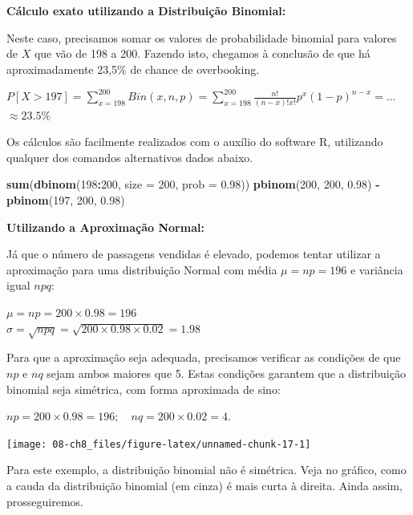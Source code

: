 \documentclass[
]{book}
\newenvironment{Shaded}{\begin{snugshade}}{\end{snugshade}}
\newcommand{\DataTypeTok}[1]{\textcolor[rgb]{0.13,0.29,0.53}{#1}}
\newcommand{\DecValTok}[1]{\textcolor[rgb]{0.00,0.00,0.81}{#1}}
\newcommand{\FloatTok}[1]{\textcolor[rgb]{0.00,0.00,0.81}{#1}}
\newcommand{\KeywordTok}[1]{\textcolor[rgb]{0.13,0.29,0.53}{\textbf{#1}}}
\newcommand{\NormalTok}[1]{#1}
\newcommand{\OperatorTok}[1]{\textcolor[rgb]{0.81,0.36,0.00}{\textbf{#1}}}
\newcommand{\StringTok}[1]{\textcolor[rgb]{0.31,0.60,0.02}{#1}}
\theoremstyle{definition}
\theoremstyle{definition}
\theoremstyle{definition}
\theoremstyle{remark}
\begin{document}
\textbf{Cálculo exato utilizando a Distribuição Binomial:}

Neste caso, precisamos somar os valores de probabilidade binomial para valores de \(X\) que vão de 198 a 200. Fazendo isto, chegamos à conclusão de que há aproximadamente 23,5\% de chance de overbooking.

\(P[X > 197] = \sum_{x=198}^{200} Bin (x, n, p) = \sum_{x=198}^{200} \frac{n!}{(n-x)!x!} p^x (1-p)^{n-x} = \ldots\)\\
\(\approx 23.5\%\)

Os cálculos são facilmente realizados com o auxílio do software R, utilizando qualquer dos comandos alternativos dados abaixo.

\begin{Shaded}
\begin{Highlighting}[]
\KeywordTok{sum}\NormalTok{(}\KeywordTok{dbinom}\NormalTok{(}\DecValTok{198}\OperatorTok{:}\DecValTok{200}\NormalTok{, }\DataTypeTok{size =} \DecValTok{200}\NormalTok{, }\DataTypeTok{prob =} \FloatTok{0.98}\NormalTok{))  }
\KeywordTok{pbinom}\NormalTok{(}\DecValTok{200}\NormalTok{, }\DecValTok{200}\NormalTok{, }\FloatTok{0.98}\NormalTok{) }\OperatorTok{-}\StringTok{ }\KeywordTok{pbinom}\NormalTok{(}\DecValTok{197}\NormalTok{, }\DecValTok{200}\NormalTok{, }\FloatTok{0.98}\NormalTok{)}
\end{Highlighting}
\end{Shaded}

\textbf{Utilizando a Aproximação Normal:}

Já que o número de passagens vendidas é elevado, podemos tentar utilizar a aproximação para uma distribuição Normal com média \(\mu = np = 196\) e variância igual \(npq\):

\(\mu = np = 200 \times 0.98 = 196\)\\
\(\sigma = \sqrt{npq} = \sqrt{200 \times 0.98 \times 0.02} = 1.98\)

Para que a aproximação seja adequada, precisamos verificar as condições de que \(np\) e \(nq\) sejam ambos maiores que 5. Estas condições garantem que a distribuição binomial seja simétrica, com forma aproximada de sino:

\(np = 200 \times 0.98 = 196; \quad nq = 200 \times 0.02 = 4\).

\begin{center}\texttt{[image: 08-ch8\_files/figure-latex/unnamed-chunk-17-1]} \end{center}

Para este exemplo, a distribuição binomial não é simétrica. Veja no gráfico, como a cauda da distribuição binomial (em cinza) é mais curta à direita. Ainda assim, prosseguiremos.
\end{document}
